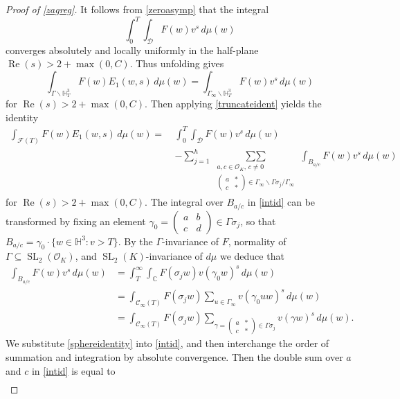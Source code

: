\documentclass[12pt,reqno]{amsart}
\numberwithin{equation}{section}
\renewcommand{\Re}{\operatorname{Re}}
\DeclareMathOperator{\SL}{SL}
\newcommand{\sumtwo}{\operatorname*{\sum\sum}}
\renewcommand{\pmatrix}[4]{\left(\begin{smallmatrix}#1 & #2 \\ #3 & #4\end{smallmatrix}\right)}
\begin{document}
\begin{proof}[Proof of \cref{zagreg}]
It follows from \eqref{zeroasymp} that the integral 
\begin{equation*}
    \int_{0}^{T} \int_{\mathcal{D}} F(w) v^{s} \, d\mu(w)
\end{equation*}
converges absolutely and locally uniformly in the half-plane $\Re(s)>2+\max(0,C)$. Thus unfolding gives
\begin{equation} \label{RSidentT}
    \int_{\Gamma \backslash \mathbb{H}_T^3} F(w) E_{1}(w,s)\, d \mu(w)=\int_{\Gamma_{\infty} \backslash \mathbb{H}_T^3 } F(w) v^s\, d \mu(w)
\end{equation}
for $\Re(s)>2+\max(0,C)$. Then applying \eqref{truncateident} yields the identity
\begin{equation}\label{intid}
\begin{aligned}
    \int_{\mathcal{F}(T) } F(w) E_{1}(w,s) \, d \mu(w) =\ & \int_{0}^{T} \int_{\mathcal{D}} F(w) v^{s} \, d\mu(w) \\
    &- \sum_{j=1}^{h} \sumtwo_{\substack{a,c \in \mathcal{O}_{K}, \, c \neq 0 \\  \pmatrix {a} {*} {c} {*} \in \Gamma_{\infty} \backslash \Gamma \sigma_{j} / \Gamma_{\infty} }} 
    \int_{B_{a/c}} F(w) v^{s} \, d\mu(w)
\end{aligned}
\end{equation}
for $\Re(s)>2+\max(0,C)$. The integral over $B_{a/c}$ in \eqref{intid} can be transformed by fixing an element $\gamma_0= \pmatrix {a} {b} {c} {d} \in \Gamma \sigma_{j}$, so that $B_{a/c} = \gamma_0 \cdot \big\{w \in \mathbb{H}^3: v>T \big\}$. By the $\Gamma$-invariance of $F$, normality of $\Gamma \subseteq \SL_2(\mathcal{O}_K)$, and $\SL_2(K)$-invariance of $d \mu$ we deduce that 
\begin{align} \label{sphereidentity}
    \int_{B_{a/c}} F(w) v^{s} \, d\mu(w) &=\int_{T}^{\infty} \int_{\mathbb{C}} F(\sigma_{j} w) v(\gamma_0 w)^s \, d \mu(w) \nonumber \\
    &=\int_{\mathcal{C}_{\infty}(T)} F(\sigma_{j} w) \sum_{u \in \Gamma_{\infty} } v(\gamma_0 u w)^s \, d \mu(w) \nonumber \\
    &=\int_{\mathcal{C}_{\infty}(T)} F(\sigma_{j} w) \sum_{\gamma=\pmatrix {a} {*} {c} {*} \in \Gamma \sigma_{j} } 
    v(\gamma w)^s \, d \mu(w).
\end{align}
We substitute \eqref{sphereidentity} into \eqref{intid}, and then interchange the order of summation and integration by absolute convergence. Then the double sum over $a$ and $c$ in \eqref{intid} is equal to 
\begin{align} \label{intintermed2}

\end{align}
\end{proof}
\end{document}
